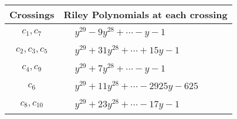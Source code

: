 \documentclass[1p]{elsarticle_modified}
\theoremstyle{definition}
\begin{document}
\begin{tabular}{m{50pt}|m{274pt}}
Crossings & \hspace{64pt}Riley Polynomials at each crossing \\
\hline $$\begin{aligned}c_{1},c_{7}\end{aligned}$$&$\begin{aligned}
&y^{29}-9 y^{28}+\cdots- y-1
\end{aligned}$\\
\hline $$\begin{aligned}c_{2},c_{3},c_{5}\end{aligned}$$&$\begin{aligned}
&y^{29}+31 y^{28}+\cdots+15 y-1
\end{aligned}$\\
\hline $$\begin{aligned}c_{4},c_{9}\end{aligned}$$&$\begin{aligned}
&y^{29}+7 y^{28}+\cdots- y-1
\end{aligned}$\\
\hline $$\begin{aligned}c_{6}\end{aligned}$$&$\begin{aligned}
&y^{29}+11 y^{28}+\cdots-2925 y-625
\end{aligned}$\\
\hline $$\begin{aligned}c_{8},c_{10}\end{aligned}$$&$\begin{aligned}
&y^{29}+23 y^{28}+\cdots-17 y-1
\end{aligned}$\\
\hline
\end{tabular}
\vskip 2pc
\end{document}
